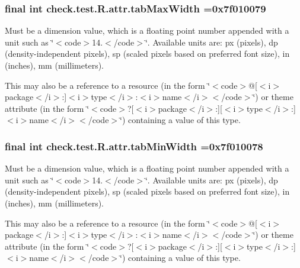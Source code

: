 \subsubsection[{tab\+Max\+Width}]{\setlength{\rightskip}{0pt plus 5cm}final int check.\+test.\+R.\+attr.\+tab\+Max\+Width =0x7f010079\hspace{0.3cm}{\ttfamily [static]}}\label{classcheck_1_1test_1_1_r_1_1attr_a4891fae4f27ae76a2dd289815ab27d96}
Must be a dimension value, which is a floating point number appended with a unit such as \char`\"{}$<$code$>$14.\+5sp$<$/code$>$\char`\"{}. Available units are\+: px (pixels), dp (density-\/independent pixels), sp (scaled pixels based on preferred font size), in (inches), mm (millimeters). 

This may also be a reference to a resource (in the form \char`\"{}$<$code$>$@\mbox{[}$<$i$>$package$<$/i$>$\+:\mbox{]}$<$i$>$type$<$/i$>$\+:$<$i$>$name$<$/i$>$$<$/code$>$\char`\"{}) or theme attribute (in the form \char`\"{}$<$code$>$?\mbox{[}$<$i$>$package$<$/i$>$\+:\mbox{]}\mbox{[}$<$i$>$type$<$/i$>$\+:\mbox{]}$<$i$>$name$<$/i$>$$<$/code$>$\char`\"{}) containing a value of this type. \hypertarget{classcheck_1_1test_1_1_r_1_1attr_ad78063e863c2df7fa0fdcc6222541690}{}
\subsubsection[{tab\+Min\+Width}]{\setlength{\rightskip}{0pt plus 5cm}final int check.\+test.\+R.\+attr.\+tab\+Min\+Width =0x7f010078\hspace{0.3cm}{\ttfamily [static]}}\label{classcheck_1_1test_1_1_r_1_1attr_ad78063e863c2df7fa0fdcc6222541690}
Must be a dimension value, which is a floating point number appended with a unit such as \char`\"{}$<$code$>$14.\+5sp$<$/code$>$\char`\"{}. Available units are\+: px (pixels), dp (density-\/independent pixels), sp (scaled pixels based on preferred font size), in (inches), mm (millimeters). 

This may also be a reference to a resource (in the form \char`\"{}$<$code$>$@\mbox{[}$<$i$>$package$<$/i$>$\+:\mbox{]}$<$i$>$type$<$/i$>$\+:$<$i$>$name$<$/i$>$$<$/code$>$\char`\"{}) or theme attribute (in the form \char`\"{}$<$code$>$?\mbox{[}$<$i$>$package$<$/i$>$\+:\mbox{]}\mbox{[}$<$i$>$type$<$/i$>$\+:\mbox{]}$<$i$>$name$<$/i$>$$<$/code$>$\char`\"{}) containing a value of this type. \hypertarget{classcheck_1_1test_1_1_r_1_1attr_a813adba1ffde6ec58ce835911d9db617}{}
